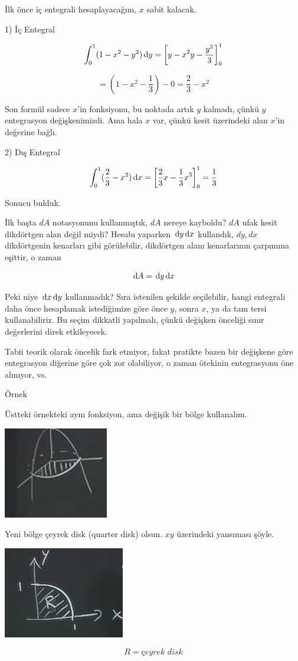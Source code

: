 \documentclass[12pt,fleqn]{article}\usepackage{../../common}
\begin{document}
İlk önce iç entegrali hesaplayacağım, $x$ sabit kalacak. 

1) İç Entegral

$$
\int_0^1 (1-x^2-y^2) \,\mathrm{d} y
= \bigg[ y - x^2y - \frac{y^3}{3} \bigg]_0^1
$$

$$ = (1 - x^2 - \frac{1}{3}) - 0 = \frac{2}{3} - x^2$$

Son formül sadece $x$'in fonksiyonu, bu noktada artık $y$ kalmadı, çünkü $y$
entegrasyon değişkenimizdi. Ama hala $x$ var, çünkü kesit üzerindeki alan $x$'in
değerine bağlı.

2) Dış Entegral 

$$
\int_0^1 (\frac{2}{3} - x^2) \,\mathrm{d} x
= \bigg[ \frac{2}{3}x - \frac{1}{3}x^3 \bigg]_0^1 = \frac{1}{3}
 $$

Sonucu bulduk. 

İlk başta $dA$ notasyonunu kullanmıştık, $dA$ nereye kayboldu? $dA$ ufak kesit
dikdörtgen alan değil miydi? Hesabı yaparken $\,\mathrm{d} y \,\mathrm{d} x$ kullandık, $dy,dx$
dikdörtgenin kenarları gibi görülebilir, dikdörtgen alanı kenarlarının çarpımına
eşittir, o zaman

$$ \,\mathrm{d} A = \,\mathrm{d} y \,\mathrm{d} x $$

Peki niye $\,\mathrm{d} x \,\mathrm{d} y$ kullanmadık? Sıra istenilen şekilde seçilebilir, hangi
entegrali daha önce hesaplamak istediğimize göre önce $y$, sonra $x$, ya da
tam tersi kullanabiliriz. Bu seçim dikkatli yapılmalı, çünkü değişken
önceliği sınır değerlerini direk etkileyecek. 

Tabii teorik olarak öncelik fark etmiyor, fakat pratikte bazen bir değişkene
göre entegrasyon diğerine göre çok zor olabiliyor, o zaman ötekinin
entegrasyonu öne alınıyor, vs.

Örnek

Üstteki örnekteki aynı fonksiyon, ama değişik bir bölge kullanalım. 
\begin{center}
\includegraphics[height=4cm]{16_9.png}
\end{center}
Yeni bölge çeyrek disk (quarter disk) olsun. $xy$ üzerindeki yansıması
şöyle. 
\begin{center}
\includegraphics[height=4cm]{16_10.png}
\end{center}
$$ R = \textit{çeyrek disk}  $$
\end{document}
